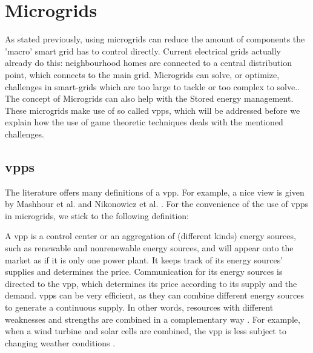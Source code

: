 \section{Microgrids}



As stated previously, using microgrids can reduce the amount of components the 'macro' smart grid has to control directly. Current electrical grids actually already do this: neighbourhood homes are connected to a central distribution point, which connects to the main grid.
Microgrids can solve, or optimize, challenges in smart-grids which are too large to tackle or too complex to solve.\cite{MicrogridModellingPetrosAristidou}. The concept of Microgrids can also help with the Stored energy management.
These microgrids make use of so called \acp{vpp}, which will be addressed before we explain how the use of game theoretic techniques deals with the mentioned challenges.



\subsection{\aclp{vpp}}
The literature offers many definitions of a \ac{vpp}. For example, a nice view is given by Mashhour et al. \cite{MashhourMoghaddas-Tafreshi2011} and Nikonowicz et al. \cite{NikonowiczMilewski2012}.  For the convenience of the use of \acp{vpp} in microgrids, we stick to the following definition:

A \ac{vpp} is a control center or an aggregation of (different kinds) energy sources, such as renewable and nonrenewable energy sources, and will appear onto the market as if it is only one power plant. It keeps track of its energy sources' supplies and determines the price. Communication for its energy sources is directed to the \ac{vpp}, which determines its price according to its supply and the demand. \acp{vpp} can be very efficient, as they can combine different energy sources to generate a continuous supply. In other words, resources with different weaknesses and strengths are combined in a complementary way \cite{Koeppel2003}. For example, when a wind turbine and solar cells are combined, the \ac{vpp} is less subject to changing weather conditions \cite{Tromly2001, Kumagai2012, MashhourMoghaddas-Tafreshi2011, NikonowiczMilewski2012}. 

